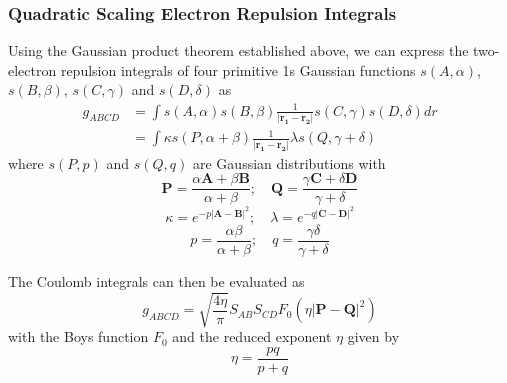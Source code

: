 \subsubsection{Quadratic Scaling Electron Repulsion Integrals} 

Using the Gaussian product theorem established above, we can express the two-electron repulsion integrals of four primitive 1s Gaussian functions $s(A,\alpha)$, $s(B,\beta)$, $s(C,\gamma)$ and $s(D,\delta)$ as
\begin{equation}
\begin{split}
g_{ABCD} &= \int s(A,\alpha) s(B,\beta) \frac{1}{\left\lvert \mathbf{r_1} - \mathbf{r_2} \right\rvert} s(C,\gamma) s(D,\delta) dr \\
&= \int \kappa s(P, \alpha+\beta) \frac{1}{\left\lvert \mathbf{r_1} - \mathbf{r_2} \right\rvert} \lambda s(Q, \gamma+\delta)
\end{split}
\end{equation}
\noindent where $s(P,p)$ and $s(Q,q)$ are Gaussian distributions with
\begin{equation}
\mathbf{P} = \frac{\alpha \mathbf{A} + \beta \mathbf{B}}{\alpha + \beta} ; \quad \mathbf{Q} = \frac{\gamma \mathbf{C} + \delta \mathbf{D}}{\gamma + \delta}
\end{equation}
\begin{equation}
\kappa = e^{-p\left\lvert \mathbf{A} - \mathbf{B} \right\rvert^2} ; \quad \lambda = e^{-q\left\lvert \mathbf{C} - \mathbf{D} \right\rvert^2}
\end{equation}
\begin{equation}
p = \frac{\alpha\beta}{\alpha+\beta}; \quad q = \frac{\gamma\delta}{\gamma+\delta}
\end{equation}

\noindent The Coulomb integrals can then be evaluated as 
\begin{equation}
g_{ABCD} = \sqrt{\frac{4 \eta}{\pi}} S_{AB} S_{CD} F_0\left(\eta \left\lvert \mathbf{P} - \mathbf{Q} \right\rvert^2 \right)
\end{equation}
\noindent with the Boys function $F_0$ and the reduced exponent $\eta$ given by
\begin{equation}
\eta = \frac{pq}{p+q}
\end{equation}

